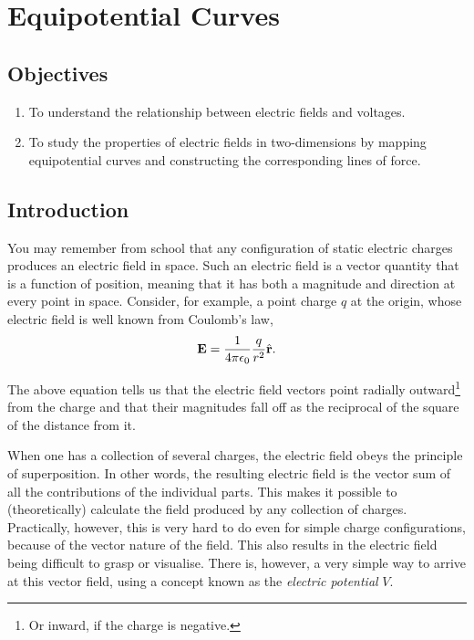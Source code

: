 \chapter{Equipotential Curves}

\section*{Objectives}
\begin{enumerate}
\item To understand the relationship between electric fields and voltages.
\item To study the properties of electric fields in two-dimensions by mapping equipotential curves and constructing the corresponding lines of force.
\end{enumerate}


\section*{Introduction}

You may remember from school that any configuration of static electric charges produces an electric field in space. Such an electric field is a vector quantity that is a function of position, meaning that it has both a magnitude and direction at every point in space. Consider, for example, a point charge $q$ at the origin, whose electric field is well known from Coulomb's law,
\begin{equation}
    \vb{E} = \frac{1}{4\pi \epsilon_0} \frac{q}{r^2} \hat{\vb{r}}.
\end{equation}

The above equation tells us that the electric field vectors point radially outward\footnote{Or inward, if the charge is negative.} from the charge and that their magnitudes fall off as the reciprocal of the square of the distance from it.

When one has a collection of several charges, the electric field obeys the principle of superposition. In other words, the resulting electric field is the vector sum of all the contributions of the individual parts. This makes it possible to (theoretically) calculate the field produced by any collection of charges. Practically, however, this is very hard to do even for simple charge configurations, because of the vector nature of the field. This also results in the electric field being difficult to grasp or visualise. There is, however, a very simple way to arrive at this vector field, using a concept known as the \textsl{electric potential} $V$.

